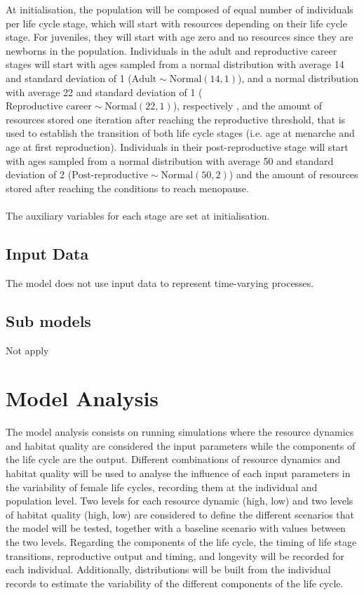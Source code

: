 \documentclass{article}
\begin{document}
At initialisation, the population will be composed of equal number of individuals per life cycle stage, which will start with resources depending on their life cycle stage. For juveniles, they will start with age zero and no resources since they are newborns in the population. Individuals in the adult and reproductive career stages will start with ages sampled from a normal distribution with average 14 and standard deviation of 1 ($\text{Adult}\sim \text{Normal}(14,1)$), and a normal distribution with average 22 and standard deviation of 1 ($\text{Reproductive career}\sim \text{Normal}(22,1)$), respectively \citep{kramer2010teen,morabia1998international,thomas2001international}, and the amount of resources stored one iteration after reaching the reproductive threshold, that is used to establish the transition of both life cycle stages (i.e. age at menarche and age at first reproduction). Individuals in their post-reproductive stage will start with ages sampled from a normal distribution with average 50 and standard deviation of 2 ($\text{Post-reproductive}\sim \text{Normal}(50,2)$) \citep{morabia1998international,thomas2001international} and the amount of resources stored after reaching the conditions to reach menopause. 
\\\\
The auxiliary variables for each stage are set at initialisation.

\subsection{Input Data}

The model does not use input data to represent time-varying processes.

\subsection{Sub models}

Not apply

\section{Model Analysis}

The model analysis consists on running simulations where the resource dynamics and habitat quality are considered the input parameters while the components of the life cycle are the output. Different combinations of resource dynamics and habitat quality will be used to analyse the influence of each input parameters in the variability of female life cycles, recording them at the individual and population level. Two levels for each resource dynamic (high, low) and two levels of habitat quality (high, low) are considered to define the different scenarios that the model will be tested, together with a baseline scenario with values between the two levels. Regarding the components of the life cycle, the timing of life stage transitions, reproductive output and timing, and longevity will be recorded for each individual. Additionally, distributions will be built from the individual records to estimate the variability of the different components of the life cycle.
\end{document}
